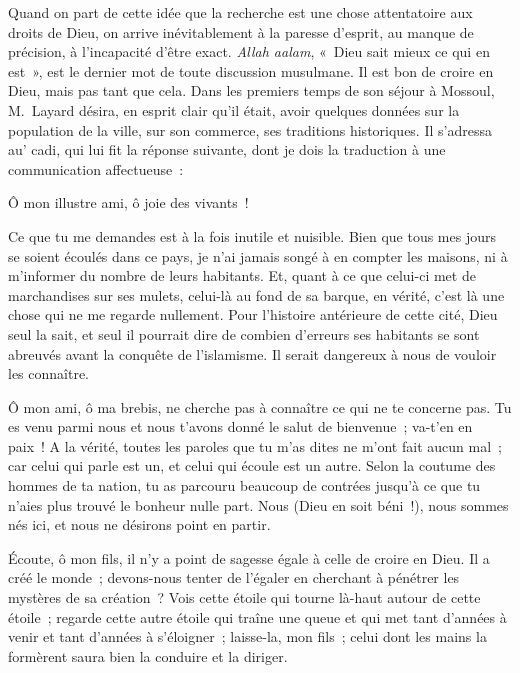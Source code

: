 \documentclass[french,twoside]{book} %
\newcommand\persName[1]{#1}
\newcommand\placeName[1]{#1}
\newenvironment{quoteblock}%
  {\begin{quoting}}
  {\end{quoting}}
\newenvironment{quotebar}{%
    \def\FrameCommand{{\color{rubric!10!}\vrule width 0.5em} \hspace{0.9em}}%
    \def\OuterFrameSep{\itemsep} %
    \MakeFramed {\advance\hsize-\width \FrameRestore}
  }%
  {%
    \endMakeFramed
  }
\renewenvironment{quoteblock}%
  {%
    \savenotes
    \setstretch{0.9}
    \normalfont
    \begin{quotebar}
  }
  {%
    \end{quotebar}
    \spewnotes
  }
\begin{document}
Quand on part de cette idée que la recherche est une chose attentatoire aux droits de {\persName Dieu}, on arrive inévitablement à la paresse d’esprit, au manque de précision, à l’incapacité d’être exact. {\itshape Allah aalam}, « Dieu sait mieux ce qui en est », est le dernier mot de toute discussion musulmane. Il est bon de croire en {\persName Dieu}, mais pas tant que cela. Dans les premiers temps de son séjour à {\placeName Mossoul}, {\persName M. Layard} désira, en esprit clair qu’il était, avoir quelques données sur la population de la ville, sur son commerce, ses traditions historiques. Il s’adressa au’ cadi, qui lui fit la réponse suivante, dont je dois la traduction à une communication affectueuse :\par

\begin{quoteblock}
 \noindent Ô mon illustre ami, ô joie des vivants !\par
 Ce que tu me demandes est à la fois inutile et nuisible. Bien que tous mes jours se soient écoulés dans ce pays, je n’ai jamais songé à en compter les maisons, ni à m’informer du nombre de leurs habitants. Et, quant à ce que celui-ci met de marchandises sur ses mulets, celui-là au fond de sa barque, en vérité, c’est là une chose qui ne me regarde nullement. Pour l’histoire antérieure de cette cité, {\persName Dieu} seul la sait, et seul il pourrait dire de combien d’erreurs ses habitants se sont abreuvés avant la conquête de l’islamisme. Il serait dangereux à nous de vouloir les connaître.\par
 Ô mon ami, ô ma brebis, ne cherche pas à connaître ce qui ne te concerne pas. Tu es venu parmi nous et nous t’avons donné le salut de bienvenue ; va-t’en en paix ! A la vérité, toutes les paroles que tu m’as dites ne m’ont fait aucun mal ; car celui qui parle est un, et celui qui écoule est un autre. Selon la coutume des hommes de ta nation, tu as parcouru beaucoup de contrées jusqu’à ce que tu n’aies plus trouvé le bonheur nulle part. Nous ({\persName Dieu} en soit béni !), nous sommes nés ici, et nous ne désirons point en partir.\par
 Écoute, ô mon fils, il n’y a point de sagesse égale à celle de croire en Dieu. Il a créé le monde ; devons-nous tenter de l’égaler en cherchant à pénétrer les mystères de sa création ? Vois cette étoile qui tourne là-haut autour de cette étoile ; regarde cette autre étoile qui traîne une queue et qui met tant d’années à venir et tant d’années à s’éloigner ; laisse-la, mon fils ; celui dont les mains la formèrent saura bien la conduire et la diriger.\par

\end{quoteblock}
\end{document}
